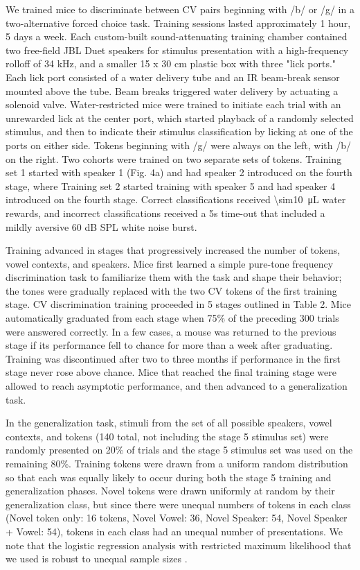 \documentclass[11pt]{article}\usepackage[]{graphicx}\usepackage[]{color}
\begin{document}
We trained mice to discriminate between CV pairs beginning with /b/ or /g/ in a two-alternative forced choice task. Training sessions lasted approximately 1 hour, 5 days a week. Each custom-built sound-attenuating training chamber contained two free-field JBL Duet speakers for stimulus presentation with a high-frequency rolloff of 34 kHz, and a smaller 15 x 30 cm plastic box with three "lick ports." Each lick port consisted of a water delivery tube and an IR beam-break sensor mounted above the tube. Beam breaks triggered water delivery by actuating a solenoid valve. Water-restricted mice were trained to initiate each trial with an unrewarded lick at the center port, which started playback of a randomly selected stimulus, and then to indicate their stimulus classification by licking at one of the ports on either side. Tokens beginning with /g/ were always on the left, with /b/ on the right. Two cohorts were trained on two separate sets of tokens. Training set 1 started with speaker 1 (Fig. 4a) and had speaker 2 introduced on the fourth stage, where Training set 2 started training with speaker 5 and had speaker 4 introduced on the fourth stage. Correct classifications received \SI{\sim10}{\micro\liter} water rewards, and incorrect classifications received a 5s time-out that included a mildly aversive 60 dB SPL white noise burst.

Training advanced in stages that progressively increased the number of tokens, vowel contexts, and speakers. Mice first learned a simple pure-tone frequency discrimination task to familiarize them with the task and shape their behavior; the tones were gradually replaced with the two CV tokens of the first training stage. CV discrimination training proceeded in 5 stages outlined in Table 2. Mice automatically graduated from each stage when 75\% of the preceding 300 trials were answered correctly. In a few cases, a mouse was returned to the previous stage if its performance fell to chance for more than a week after graduating. Training was discontinued after two to three months if performance in the first stage never rose above chance. Mice that reached the final training stage were allowed to reach asymptotic performance, and then advanced to a generalization task.%

In the generalization task, stimuli from the set of all possible speakers, vowel contexts, and tokens (140 total, not including the stage 5 stimulus set) were randomly presented on 20\% of trials and the stage 5 stimulus set was used on the remaining 80\%. Training tokens were drawn from a uniform random distribution so that each was equally likely to occur during both the stage 5 training and generalization phases. Novel tokens were drawn uniformly at random by their generalization class, but since there were unequal numbers of tokens in each class (Novel token only: 16 tokens, Novel Vowel: 36, Novel Speaker: 54, Novel Speaker + Vowel: 54), tokens in each class had an unequal number of presentations. We note that the logistic regression analysis with restricted maximum likelihood that we used is robust to unequal sample sizes \cite{Patterson1971}.
\end{document}
